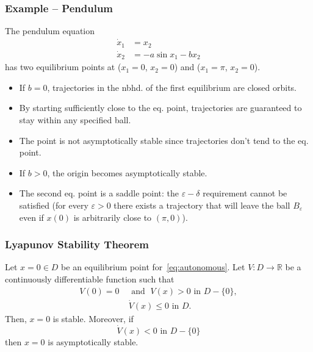 \begin{frame}
    \frametitle{Example -- Pendulum}

    The pendulum equation
    \begin{align*}
        \dot{x}_1 &= x_2 \\
        \dot{x}_2 &= -a \sin{x_1} - b x_2
    \end{align*}
    has two equilibrium points at ($x_1 = 0$, $x_2 = 0$) and ($x_1 = \pi$, $x_2
    = 0$).
    \begin{itemize}
        \item If $b=0$, trajectories in the nbhd. of the first equilibrium are 
        closed orbits.
        \item By starting sufficiently close to the eq. point, trajectories are 
        guaranteed to stay within any specified ball.
        \item The point is not asymptotically stable since trajectories don't
        tend to the eq. point.
        \item If $b > 0$, the origin becomes asymptotically stable.
        \item The second eq. point is a saddle point: the $\varepsilon-\delta$
        requirement cannot be satisfied (for every $\varepsilon > 0$ there
        exists a trajectory that will leave the ball $B_\varepsilon$ even if
        $x(0)$ is arbitrarily close to $(\pi, 0)$).
    \end{itemize}
\end{frame}


\begin{frame}
    \frametitle{Lyapunov Stability Theorem}

    \begin{theorem}
        Let $x=0 \in D$ be an equilibrium point for~\eqref{eq:autonomous}. Let
        $V: D \rightarrow \mathbb{R}$ be a continuously differentiable function
        such that
        \begin{align*}
            V(0) = 0 \; &\text{ and } \; V(x) > 0 \text{ in } D - \{0\}, \\
            &\dot{V}(x) \leq 0 \text{ in } D.
        \end{align*}
        Then, $x=0$ is stable. Moreover, if
        \[ \dot{V}(x) < 0 \text{ in } D - \{0\} \] then $x=0$ is asymptotically
        stable.
    \end{theorem}
\end{frame}


